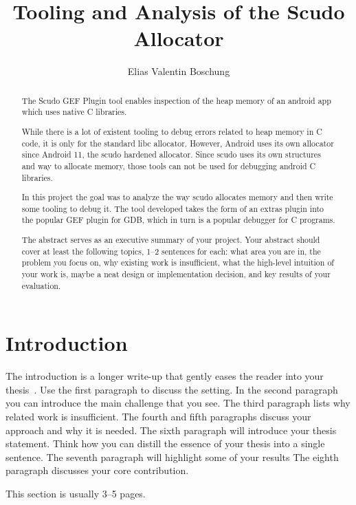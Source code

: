 \documentclass[a4paper,11pt,oneside]{report}
\title{Tooling and Analysis of the Scudo Allocator}
\author{Elias Valentin Boschung}
\newcommand{\sysname}{Scudo GEF Plugin\xspace}
\begin{document}
\maketitle{}
\makededication{}
\makeacks{}

\begin{abstract}
The \sysname{} tool enables inspection of the heap memory of an android app
which uses native C libraries.

While there is a lot of existent tooling to debug errors related to heap
memory in C code, it is only for the standard libc allocator. However,
Android uses its own allocator since Android 11, the scudo hardened
allocator. Since scudo uses its own structures and way to allocate memory,
those tools can not be used for debugging android C libraries.

In this project the goal was to analyze the way scudo allocates memory and
then write some tooling to debug it. The tool developed takes the form of
an extras plugin into the popular GEF plugin for GDB, which in turn is a
popular debugger for C programs.


The abstract serves as an executive summary of your project.
Your abstract should cover at least the following topics, 1–2 sentences for
each: what area you are in, the problem you focus on, why existing work is
insufficient, what the high-level intuition of your work is, maybe a neat
design or implementation decision, and key results of your evaluation.
\end{abstract}

\maketoc{}

\chapter{Introduction}

The introduction is a longer write-up that gently eases the reader into your
thesis~\cite{dinesh20oakland}. Use the first paragraph to discuss the setting.
In the second paragraph you can introduce the main challenge that you see.
The third paragraph lists why related work is insufficient.
The fourth and fifth paragraphs discuss your approach and why it is needed.
The sixth paragraph will introduce your thesis statement. Think how you can
distill the essence of your thesis into a single sentence.
The seventh paragraph will highlight some of your results
The eighth paragraph discusses your core contribution.

This section is usually 3–5 pages.
\end{document}
